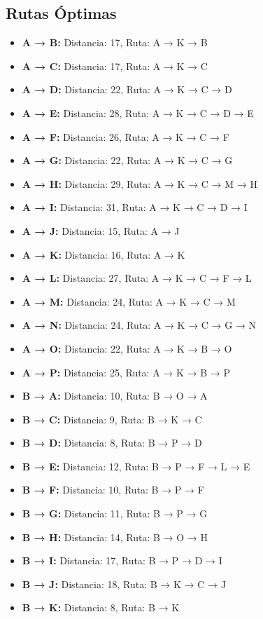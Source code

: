 \documentclass[12pt]{article}
\begin{document}
\subsection{Rutas Óptimas}
\begin{itemize}
\item \textbf{A → B:} Distancia: 17, Ruta: A → K → B
\item \textbf{A → C:} Distancia: 17, Ruta: A → K → C
\item \textbf{A → D:} Distancia: 22, Ruta: A → K → C → D
\item \textbf{A → E:} Distancia: 28, Ruta: A → K → C → D → E
\item \textbf{A → F:} Distancia: 26, Ruta: A → K → C → F
\item \textbf{A → G:} Distancia: 22, Ruta: A → K → C → G
\item \textbf{A → H:} Distancia: 29, Ruta: A → K → C → M → H
\item \textbf{A → I:} Distancia: 31, Ruta: A → K → C → D → I
\item \textbf{A → J:} Distancia: 15, Ruta: A → J
\item \textbf{A → K:} Distancia: 16, Ruta: A → K
\item \textbf{A → L:} Distancia: 27, Ruta: A → K → C → F → L
\item \textbf{A → M:} Distancia: 24, Ruta: A → K → C → M
\item \textbf{A → N:} Distancia: 24, Ruta: A → K → C → G → N
\item \textbf{A → O:} Distancia: 22, Ruta: A → K → B → O
\item \textbf{A → P:} Distancia: 25, Ruta: A → K → B → P
\item \textbf{B → A:} Distancia: 10, Ruta: B → O → A
\item \textbf{B → C:} Distancia: 9, Ruta: B → K → C
\item \textbf{B → D:} Distancia: 8, Ruta: B → P → D
\item \textbf{B → E:} Distancia: 12, Ruta: B → P → F → L → E
\item \textbf{B → F:} Distancia: 10, Ruta: B → P → F
\item \textbf{B → G:} Distancia: 11, Ruta: B → P → G
\item \textbf{B → H:} Distancia: 14, Ruta: B → O → H
\item \textbf{B → I:} Distancia: 17, Ruta: B → P → D → I
\item \textbf{B → J:} Distancia: 18, Ruta: B → K → C → J
\item \textbf{B → K:} Distancia: 8, Ruta: B → K

\end{itemize}
\end{document}
